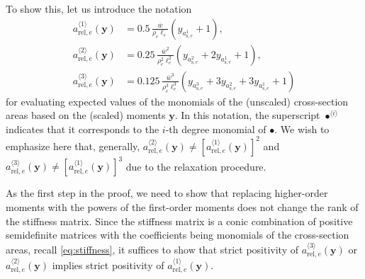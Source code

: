 \documentclass[final,onefignum,onetabnum]{siamart220329}
\begin{document}
To show this, let us introduce the notation
%
\begin{subequations}
	\begin{align}
		a_{\mathrm{rel},e}^{\langle 1\rangle}(\mathbf{y}) &= 0.5\,{\frac{\overline{w}}{\rho_e \ell_e}} (y_{a_{\mathrm{s},e}^1} + 1),\label{eq:rel_a_1}\\
		a_{\mathrm{rel},e}^{\langle 2\rangle}(\mathbf{y}) &= 0.25\, {\frac{\overline{w}^2}{\rho_e^2 \ell_e^2}} \left( y_{a_{\mathrm{s},e}^2} + 2 y_{a_{\mathrm{s},e}^1} + 1 \right),\label{eq:rel_a_2}\\
		a_{\mathrm{rel},e}^{\langle 3\rangle}(\mathbf{y}) &= 0.125\, {\frac{\overline{w}^3}{\rho_e^3 \ell_e^3}} \left( y_{a_{\mathrm{s},e}^3} + 3 y_{a_{\mathrm{s},e}^2} + 3 y_{a_{\mathrm{s},e}^1} + 1 \right)\label{eq:rel_a_3}
	\end{align}
\end{subequations}
%
for evaluating {expected values of the} monomials of the (unscaled) cross-section areas based on the (scaled) moments $\mathbf{y}$. In this notation, the superscript $\bullet^{\langle i\rangle}$ indicates that it corresponds to the $i$-th degree monomial of $\bullet$. We wish to emphasize here that, generally, $a_{\mathrm{rel},e}^{\langle 2\rangle}(\mathbf{y}) \neq \left[a_{\mathrm{rel},e}^{\langle 1\rangle}(\mathbf{y})\right]^2$ and $a_{\mathrm{rel},e}^{\langle 3\rangle}(\mathbf{y}) \neq \left[a_{\mathrm{rel},e}^{\langle 1\rangle}(\mathbf{y})\right]^3$ due to the relaxation procedure.

As the first step in the proof, we need to show that replacing higher-order moments with the powers of the first-order moments does not change the rank of the stiffness matrix. Since the stiffness matrix is a conic combination of positive semidefinite matrices with the coefficients being monomials of the cross-section areas, recall \eqref{eq:stiffness}, it suffices to show that strict positivity of $a_{\mathrm{rel},e}^{\langle 3\rangle}(\mathbf{y})$ or $a_{\mathrm{rel},e}^{\langle 2\rangle}(\mathbf{y})$ implies strict positivity of $a_{\mathrm{rel},e}^{\langle 1\rangle}(\mathbf{y})$.
\end{document}
